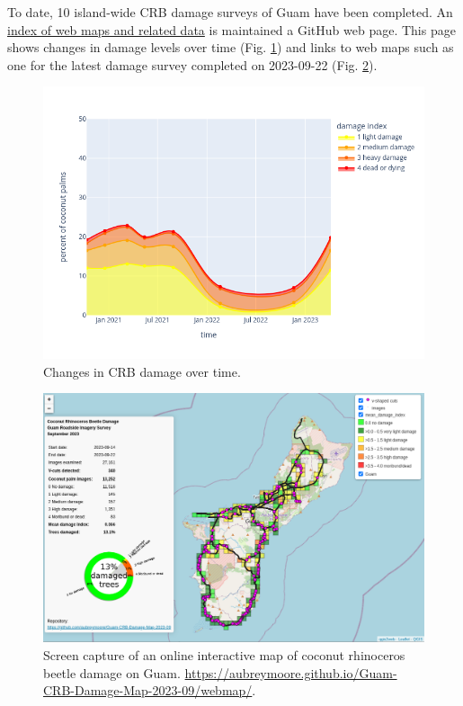 \documentclass[12pt,letterpaper,english,bibliography=totocnumbered, abstract=on]{scrartcl}
\begin{document}
To date, 10 island-wide CRB damage surveys of Guam have been completed. An \href{https://github.com/aubreymoore/Guam-CRB-web-maps}{index of web maps and related data} is maintained a GitHub web page. This page shows changes in damage levels over time (Fig. \ref{fig:timeline}) and links to web maps such as one for the latest damage survey completed on 2023-09-22 (Fig. \ref{fig:webmap-2023-09-22}).

\begin{figure}[H]
	\centering
	\includegraphics[width=\linewidth]{images/timeline}
	\caption{Changes in CRB damage over time.}
	\label{fig:timeline}
\end{figure}

\begin{figure}[H]
	\centering
	\includegraphics[width=\linewidth]{images/crb-webmap-2023-09-22}
	\caption{Screen capture of an online interactive map of coconut rhinoceros beetle damage on Guam. \url{https://aubreymoore.github.io/Guam-CRB-Damage-Map-2023-09/webmap/}.}
	\label{fig:webmap-2023-09-22}
\end{figure}
\end{document}
